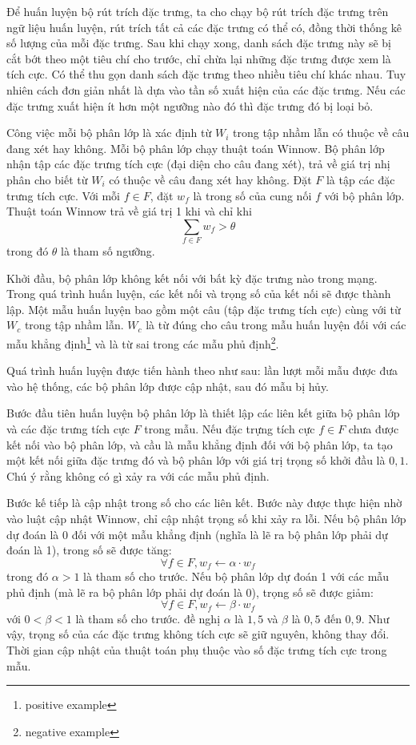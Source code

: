 \documentclass[a4paper,oneside,14pt]{extbook} %
\begin{document}
Để huấn luyện bộ rút trích đặc trưng, ta cho chạy bộ rút trích đặc
trưng trên ngữ liệu huấn luyện, rút trích tất cả các đặc trưng có thể
có, đồng thời thống kê số lượng của mỗi đặc trưng. Sau khi chạy xong,
danh sách đặc trưng này sẽ bị cắt bớt theo một tiêu chí cho trước, chỉ
chừa lại những đặc trưng được xem là tích cực. Có thể thu gọn danh
sách đặc trưng theo nhiều tiêu chí khác nhau. Tuy nhiên cách đơn giản
nhất là dựa vào tần số xuất hiện của các đặc trưng. Nếu các đặc trưng
xuất hiện ít hơn một ngưỡng nào đó thì đặc trưng đó bị loại bỏ.

Công việc mỗi bộ phân lớp là xác định từ $W_i$ trong tập nhầm lẫn có thuộc
về câu đang xét hay không. Mỗi bộ phân lớp chạy thuật toán Winnow. Bộ
phân lớp nhận tập các đặc trưng tích cực (đại diện cho câu đang xét),
trả về giá trị nhị phân cho biết từ $W_i$ có thuộc về câu đang xét hay
không. Đặt $F$ là tập các đặc trưng tích cực. Với mỗi $f\in F$, đặt
$w_f$ là trong số của cung nối $f$ với bộ phân lớp. Thuật toán Winnow
trả về giá trị 1 khi và chỉ khi $$\sum_{f\in F}w_f > \theta$$ trong đó
$\theta$ là tham số ngưỡng. 

Khởi đầu, bộ phân lớp không kết nối với bất kỳ đặc trưng nào trong
mạng. Trong quá trình huấn luyện, các kết nối và trọng số của kết nối
sẽ được thành lập. Một mẫu huấn luyện bao gồm một câu (tập đặc trưng
tích cực) cùng với từ $W_c$ trong tập nhầm lẫn. $W_c$ là từ đúng cho
câu trong mẫu huấn luyện đối với các mẫu khẳng định\footnote{positive
  example} và là từ sai trong các mẫu phủ định\footnote{negative
  example}. 

Quá trình huấn luyện được tiến hành theo như sau: lần lượt mỗi mẫu
được đưa vào hệ thống, các bộ phân lớp được cập nhật, sau đó mẫu bị
hủy.

Bước đầu tiên huấn luyện bộ phân lớp là thiết lập các liên kết
giữa bộ phân lớp và các đặc trưng tích cực $F$ trong mẫu. Nếu đặc
trựng tích cực $f \in F$ chưa được kết nối vào bộ phân lớp, và cầu là
mẫu khẳng định đối với bộ phân lớp, ta tạo một kết nối giữa đặc trưng
đó và bộ phân lớp với giá trị trọng số khởi đầu là $0,1$. Chú ý rằng
không có gì xảy ra với các mẫu phủ định. 

Bước kế tiếp là cập nhật trong số cho các liên kết. Bước này được thực
hiện nhờ vào luật cập nhật Winnow, chỉ cập nhật trọng số khi xảy ra
lỗi. Nếu bộ phân lớp dự đoán là 0 đối với một mẫu khẳng định (nghĩa là
lẽ ra bộ phân lớp phải dự đoán là 1), trong số sẽ được tăng:
$$\forall f \in F, w_f \leftarrow \alpha \cdot w_f$$
trong đó $\alpha > 1$ là tham số cho trước. Nếu bộ phân lớp dự đoán 1
với các mẫu phủ định (mà lẽ ra bộ phân lớp phải dự đoán là 0), trọng
số sẽ được giảm:
$$\forall f \in F, w_f \leftarrow \beta \cdot w_f$$
với $0 < \beta < 1$ là tham số cho trước. \cite{Golding99} đề nghị
$\alpha$ là $1,5$ và $\beta$ là $0,5$ đến $0,9$. Như vậy, trọng số của
các đặc trưng không tích cực sẽ giữ nguyên, không thay đổi. Thời gian
cập nhật của thuật toán phụ thuộc vào số đặc trưng tích cực trong mẫu.
\end{document}
